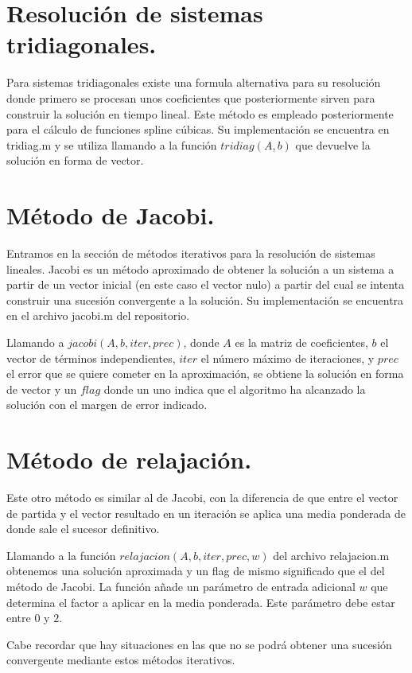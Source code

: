 \documentclass[spanish, a4paper, 12pt] {article}
\begin{document}
\section*{Resolución de sistemas tridiagonales.}
Para sistemas tridiagonales existe una formula alternativa para su resolución donde primero se procesan unos coeficientes que posteriormente sirven para construir la solución en tiempo lineal. Este método es empleado posteriormente para el cálculo de funciones spline cúbicas. Su implementación se encuentra en tridiag.m y se utiliza llamando a la función $tridiag(A, b)$ que devuelve la solución en forma de vector.
\section*{Método de Jacobi.}
Entramos en la sección de métodos iterativos para la resolución de sistemas lineales. Jacobi es un método aproximado de obtener la solución a un sistema a partir de un vector inicial (en este caso el vector nulo) a partir del cual se intenta construir una sucesión convergente a la solución. Su implementación se encuentra en el archivo jacobi.m del repositorio.\\ \par
Llamando a $jacobi(A, b, iter, prec)$, donde $A$ es la matriz de coeficientes, $b$ el vector de términos independientes, $iter$ el número máximo de iteraciones, y $prec$ el error que se quiere cometer en la aproximación, se obtiene la solución en forma de vector y un $flag$ donde un uno indica que el algoritmo ha alcanzado la solución con el margen de error indicado.
\section*{Método de relajación.}
Este otro método es similar al de Jacobi, con la diferencia de que entre el vector de partida y el vector resultado en un iteración se aplica una media ponderada de donde sale el sucesor definitivo.\\ \par
Llamando a la función $relajacion(A, b, iter, prec, w)$ del archivo relajacion.m obtenemos una solución aproximada y un flag de mismo significado que el del método de Jacobi. La función añade un parámetro de entrada adicional $w$ que determina el factor a aplicar en la media ponderada. Este parámetro debe estar entre $0$ y $2$.\\ \par
Cabe recordar que hay situaciones en las que no se podrá obtener una sucesión convergente mediante estos métodos iterativos.
\end{document}
